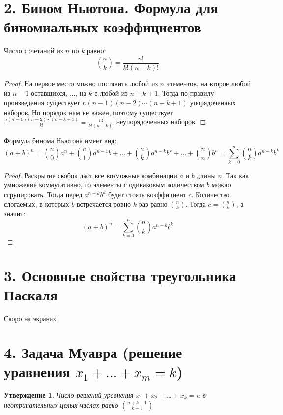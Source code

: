 \documentclass[a4paper,12pt]{article}
\newtheorem*{Statements}{Утверждение}
\begin{document}
 	\section*{2. Бином Ньютона. Формула для биномиальных коэффициентов}
    Число сочетаний из $n$ по $k$ равно:
    \[
        \binom{n}{k} = \frac{n!}{k!(n - k)!}
    \]
    \begin{proof}
        На первое место можно поставить любой из $n$ элементов, на второе любой из $n - 1$ оставшихся, $\ldots$, на $k$-е любой из $n - k + 1$. Тогда по правилу произведения существует $n(n - 1)(n - 2)\cdots(n - k + 1)$ упорядоченных наборов. Но порядок нам не важен, поэтому существует $\displaystyle\frac{n(n - 1)(n - 2)\cdots(n - k + 1)}{k!} = \frac{n!}{k!(n - k)!}$ неупорядоченных наборов.
    \end{proof}
    Формула бинома Ньютона имеет вид:
    \[
        (a + b)^{n} = \binom{n}{0}a^{n} + \binom{n}{1}a^{n - 1}b + \ldots + \binom{n}{k}a^{n - k}b^{k} + \ldots + \binom{n}{n}b^{n} = \sum_{k = 0}^{n}\binom{n}{k}a^{n - k}b^{k}
    \]
    \begin{proof}
        Раскрытие скобок даст все возможные комбинации $a$ и $b$ длины $n$. Так как умножение коммутативно, то элементы с одинаковым количеством $b$ можно сгрупировать. Тогда перед $a^{n - k}b^{k}$ будет стоять коэффициент $c$. Количество слогаемых, в которых $b$ встречается ровно $k$ раз равно $\displaystyle\binom{n}{k}$. Тогда $c = \displaystyle\binom{n}{k}$, а значит:
        \[
            (a + b)^{n} = \sum_{k = 0}^{n}\binom{n}{k}a^{n - k}b^{k}
        \]
    \end{proof}

    \section*{3. Основные свойства треугольника Паскаля}
        Скоро на экранах.

    \section*{4. Задача Муавра (решение уравнения $x_1+\ldots+x_m=k$) }
    \begin{Statements}
    Число решений уравнения $x_1 + x_2 + \ldots + x_k = n$ в неотрицательных целых
    числах равно ${n+k-1 \choose k-1}$
    \end{Statements}
\end{document}
